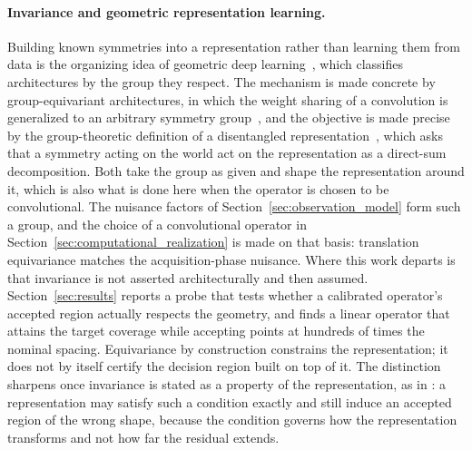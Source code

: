 \documentclass[a4paper]{cas-sc}
\begin{document}
\paragraph{Invariance and geometric representation learning.}
Building known symmetries into a representation rather than learning them from
data is the organizing idea of geometric deep
learning~\citep{bronstein2021}, which classifies architectures by the group
they respect. The mechanism is made concrete by group-equivariant
architectures, in which the weight sharing of a convolution is generalized to
an arbitrary symmetry group~\citep{cohen2016group}, and the objective is made
precise by the group-theoretic definition of a disentangled
representation~\citep{higgins2018}, which asks that a symmetry acting on the
world act on the representation as a direct-sum decomposition. Both take the
group as given and shape the representation around it, which is also what is
done here when the operator is chosen to be convolutional.
The nuisance factors of Section~\ref{sec:observation_model} form
such a group, and the choice of a convolutional operator in
Section~\ref{sec:computational_realization} is made on that basis:
translation equivariance matches the acquisition-phase nuisance. Where this
work departs is that invariance is not asserted architecturally and then
assumed. Section~\ref{sec:results} reports a probe that tests whether a
calibrated operator's accepted region actually respects the geometry, and
finds a linear operator that attains the target coverage while accepting
points at hundreds of times the nominal spacing. Equivariance by construction
constrains the representation; it does not by itself certify the decision
region built on top of it. The distinction sharpens once invariance is stated
as a property of the representation, as in \citet{higgins2018}: a
representation may satisfy such a condition exactly and still induce an
accepted region of the wrong shape, because the condition governs how the
representation transforms and not how far the residual extends.
\end{document}
